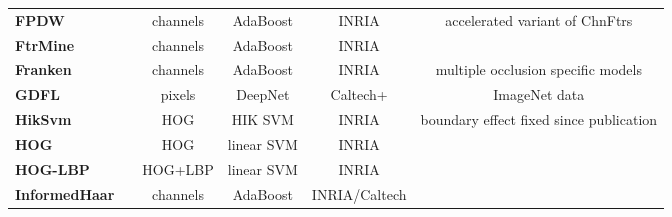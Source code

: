 \documentclass[onecolumn]{article}
\begin{document}
\begin{table}[!h]
\begin{tabular}{@{}l@{\cp}c|c@{\cp}c@{\cp}c|c@{}}
  \textbf{FPDW} & \cite{DollarBMVC10} & channels & AdaBoost & INRIA &
   accelerated variant of ChnFtrs \\
  \textbf{FtrMine} & \cite{DollarCVPR07} & channels & AdaBoost & INRIA & \\
  \textbf{Franken} & \cite{MathiasICCV13} & channels & AdaBoost & INRIA &
   multiple occlusion specific models\\
  \textbf{GDFL} & \cite{LinECCV18} & pixels & DeepNet & Caltech+ &
   ImageNet data \\
  \textbf{HikSvm} & \cite{MajiCVPR08} & HOG & HIK SVM & INRIA &
   boundary effect fixed since publication \\
  \textbf{HOG} & \cite{DalalCVPR05} & HOG & linear SVM & INRIA & \\
  \textbf{HOG-LBP} & \cite{WangICCV09} & HOG+LBP & linear SVM & INRIA & \\
  \textbf{InformedHaar} & \cite{ZhangCVPR14} & channels & AdaBoost & INRIA/Caltech & \\
\end{tabular}\end{table}
\end{document}
